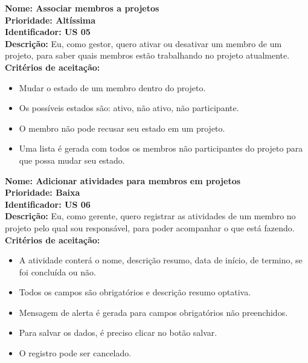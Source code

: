 \begin{anexosenv}
\textbf{Nome: Associar membros a projetos\\
Prioridade: Altíssima\\
Identificador: US 05\\
Descrição:} Eu, como gestor, quero ativar ou desativar um membro de um projeto, para saber quais membros estão trabalhando no projeto atualmente.\\
\textbf{Critérios de aceitação:}
\begin{itemize}
    \item Mudar o estado de um membro dentro do projeto.
    \item Os possíveis estados são: ativo, não ativo, não participante.
    \item O membro não pode recusar seu estado em um projeto.
    \item Uma lista é gerada com todos os membros não participantes do projeto para que possa mudar seu estado.
\end{itemize}


\textbf{Nome: Adicionar atividades para membros em projetos\\
Prioridade: Baixa\\
Identificador: US 06\\
Descrição:} Eu, como gerente, quero registrar as atividades de um membro no projeto pelo qual sou responsável, para poder acompanhar o que está fazendo.\\
\textbf{Critérios de aceitação:}
\begin{itemize}
    \item A atividade conterá o nome, descrição resumo, data de início, de termino, se foi concluída ou não.
    \item Todos os campos são obrigatórios e descrição resumo optativa.
    \item Mensagem de alerta é gerada para campos obrigatórios não preenchidos.
    \item Para salvar os dados, é preciso clicar no botão salvar.
    \item O registro pode ser cancelado.
\end{itemize}


\end{anexosenv}
